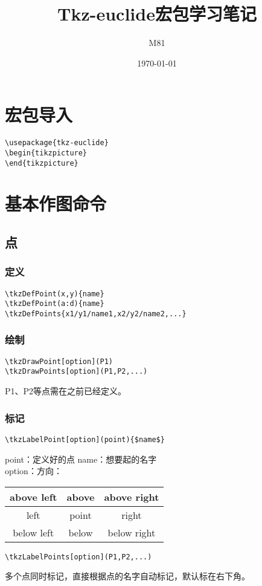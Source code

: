 \documentclass[UTF8]{ctexart}
\title{Tkz-euclide宏包学习笔记}
\author{M81}
\date{\today}
\begin{document}
\maketitle
\tableofcontents
\section{宏包导入}
\begin{lstlisting}
\usepackage{tkz-euclide}
\begin{tikzpicture}
\end{tikzpicture}
\end{lstlisting}
\section{基本作图命令}
\subsection{点}
\subsubsection{定义}
\begin{lstlisting}
\tkzDefPoint(x,y){name}
\tkzDefPoint(a:d){name}
\tkzDefPoints{x1/y1/name1,x2/y2/name2,...}
\end{lstlisting}
\subsubsection{绘制}
\begin{lstlisting}
\tkzDrawPoint[option](P1)
\tkzDrawPoints[option](P1,P2,...)
\end{lstlisting}
P1、P2等点需在之前已经定义。
\subsubsection{标记}
\begin{lstlisting}
\tkzLabelPoint[option](point){$name$}
\end{lstlisting}
point：定义好的点  name：想要起的名字\\
option：方向：\\
\begin{tabular}{|c|c|c|}
\hline
above left & above & above right\\
\hline
left & point & right\\
\hline
below left & below & below right\\
\hline
\end{tabular}
\begin{lstlisting}
\tkzLabelPoints[option](P1,P2,...)
\end{lstlisting}
多个点同时标记，直接根据点的名字自动标记，默认标在右下角。
\end{document}
